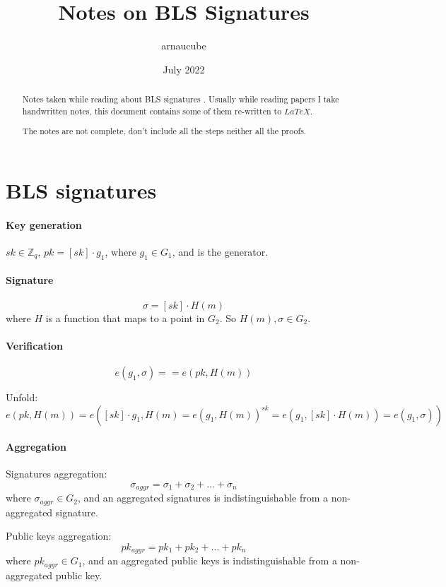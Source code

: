 \documentclass{article}
\title{Notes on BLS Signatures}
\author{arnaucube}
\date{July 2022}
\theoremstyle{definition}
\begin{document}
\maketitle

\begin{abstract}
	Notes taken while reading about BLS signatures \cite{bls-sig-eth2}. Usually while reading papers I take handwritten notes, this document contains some of them re-written to $LaTeX$.

	The notes are not complete, don't include all the steps neither all the proofs.
\end{abstract}


\section{BLS signatures}

\paragraph{Key generation}
$sk \in \mathbb{Z}_q$, $pk = [sk] \cdot g_1$, where $g_1 \in G_1$, and is the generator.

\paragraph{Signature}
$$\sigma = [sk] \cdot H(m)$$
where $H$ is a function that maps to a point in $G_2$. So $H(m), \sigma \in G_2$.

\paragraph{Verification}
$$e(g_1, \sigma) == e(pk, H(m))$$

Unfold:
$$e(pk, H(m)) = e([sk] \cdot g_1, H(m) = e(g_1, H(m))^{sk} = e(g_1, [sk] \cdot H(m)) = e(g_1, \sigma))$$

\paragraph{Aggregation}
Signatures aggregation:
$$\sigma_{aggr} = \sigma_1 + \sigma_2 + \ldots + \sigma_n$$
where $\sigma_{aggr} \in G_2$, and an aggregated signatures is indistinguishable from a non-aggregated signature.

\vspace{0.5cm}
Public keys aggregation:
$$pk_{aggr} = pk_1 + pk_2 + \ldots + pk_n$$
where $pk_{aggr} \in G_1$, and an aggregated public keys is indistinguishable from a non-aggregated public key.
\end{document}
